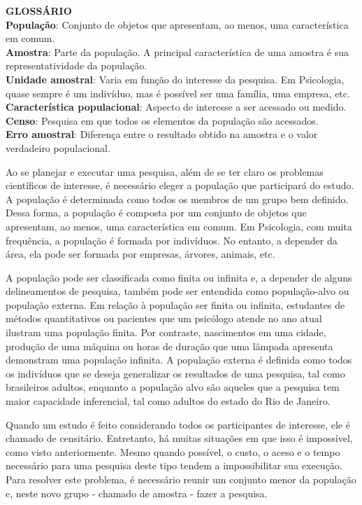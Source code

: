 \documentclass[
]{book}
\begin{document}
\begin{glossario}
\textbf{GLOSSÁRIO}\\
\textbf{População}: Conjunto de objetos que apresentam, ao menos, uma
característica em comum.\\
\textbf{Amostra}: Parte da população. A principal característica de uma
amostra é sua representatividade da população.\\
\textbf{Unidade amostral}: Varia em função do interesse da pesquisa. Em
Psicologia, quase sempre é um indivíduo, mas é possível ser uma família,
uma empresa, etc.\\
\textbf{Característica populacional}: Aspecto de interesse a ser
acessado ou medido.\\
\textbf{Censo}: Pesquisa em que todos os elementos da população são
acessados.\\
\textbf{Erro amostral}: Diferença entre o resultado obtido na amostra e
o valor verdadeiro populacional.
\end{glossario}

Ao se planejar e executar uma pesquisa, além de se ter claro os
problemas científicos de interesse, é necessário eleger a população que
participará do estudo. A população é determinada como todos os membros
de um grupo bem definido. Dessa forma, a população é composta por um
conjunto de objetos que apresentam, ao menos, uma característica em
comum. Em Psicologia, com muita frequência, a população é formada por
indivíduos. No entanto, a depender da área, ela pode ser formada por
empresas, árvores, animais, etc.

A população pode ser classificada como finita ou infinita e, a depender
de alguns delineamentos de pesquisa, também pode ser entendida como
população-alvo ou população externa. Em relação à população ser finita
ou infinita, estudantes de métodos quantitativos ou pacientes que um
psicólogo atende no ano atual ilustram uma população finita. Por
contraste, nascimentos em uma cidade, produção de uma máquina ou horas
de duração que uma lâmpada apresenta demonstram uma população infinita.
A população externa é definida como todos os indivíduos que se deseja
generalizar os resultados de uma pesquisa, tal como brasileiros adultos,
enquanto a população alvo são aqueles que a pesquisa tem maior
capacidade inferencial, tal como adultos do estado do Rio de Janeiro.

Quando um estudo é feito considerando todos os participantes de
interesse, ele é chamado de censitário. Entretanto, há muitas situações
em que isso é impossível, como visto anteriormente. Mesmo quando
possível, o custo, o aceso e o tempo necessário para uma pesquisa deste
tipo tendem a impossibilitar sua execução. Para resolver este problema,
é necessário reunir um conjunto menor da população e, neste novo grupo -
chamado de amostra - fazer a pesquisa.
\end{document}
